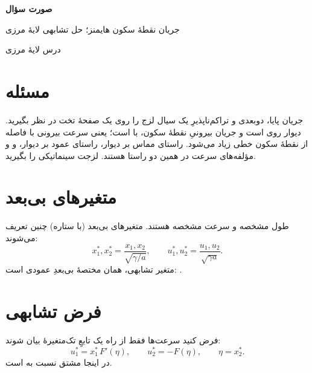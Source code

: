 \documentclass[12pt,a4paper]{article}
\begin{document}
\begin{center}
{\Large\bfseries صورت سؤال\par}
\vspace{1ex}
{\large جریان نقطهٔ سکون هایمنز؛ حل تشابهی لایهٔ مرزی\par}
\vspace{1ex}
{\small درس لایهٔ مرزی\par}
\end{center}

\section{مسئله}
جریان پایا، دوبعدی و تراکم‌ناپذیرِ یک سیال لزج را روی یک صفحهٔ تخت در
نظر بگیرید. دیوار روی  است و جریان بیرونیِ نقطهٔ سکون،
 با  است؛ یعنی سرعت بیرونی با فاصله از نقطهٔ
سکون خطی زیاد می‌شود.  راستای مماس بر دیوار،  راستای
عمود بر دیوار، و  و  مؤلفه‌های سرعت در همین دو راستا
هستند. لزجت سینماتیکی را \lr{$\gamma$} بگیرید.

\section{متغیرهای بی‌بعد}
طول مشخصه  و سرعت مشخصه 
هستند. متغیرهای بی‌بعد (با ستاره) چنین تعریف می‌شوند:
\begin{equation}
x_1^*, x_2^* = \frac{x_1, x_2}{\sqrt{\gamma/a}},
\qquad
u_1^*, u_2^* = \frac{u_1, u_2}{\sqrt{\gamma a}}.
\end{equation}
متغیر تشابهی، همان مختصهٔ بی‌بعدِ عمودی است:
.

\section{فرض تشابهی}
فرض کنید سرعت‌ها فقط از راه یک تابعِ تک‌متغیرهٔ  بیان شوند:
\begin{equation}
u_1^* = x_1^*\, F'(\eta),
\qquad
u_2^* = -F(\eta),
\qquad \eta = x_2^*.
\end{equation}
در اینجا  مشتق نسبت به \lr{$\eta$} است.
\end{document}
